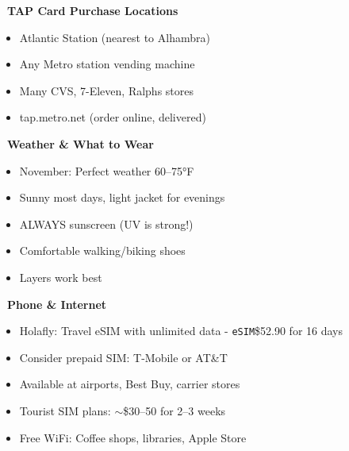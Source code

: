 \documentclass[10pt,letterpaper]{article}
\begin{document}
\begin{infobox}[colback=gray!10,colframe=gray]
\textbf{\faCreditCard\ TAP Card Purchase Locations}
\begin{small}
\begin{itemize}[leftmargin=0.2in,itemsep=0pt]
\item Atlantic Station (nearest to Alhambra)
\item Any Metro station vending machine
\item Many CVS, 7-Eleven, Ralphs stores
\item tap.metro.net (order online, delivered)
\end{itemize}
\end{small}
\end{infobox}

\begin{infobox}[colback=gray!10,colframe=gray]
\textbf{\faSun\ Weather \& What to Wear}
\begin{small}
\begin{itemize}[leftmargin=0.2in,itemsep=0pt]
\item November: Perfect weather 60--75°F
\item Sunny most days, light jacket for evenings
\item ALWAYS sunscreen (UV is strong!)
\item Comfortable walking/biking shoes
\item Layers work best
\end{itemize}
\end{small}
\end{infobox}

\begin{infobox}[colback=gray!10,colframe=gray]
\textbf{\faMobile\ Phone \& Internet}
\begin{small}
\begin{itemize}[leftmargin=0.2in,itemsep=0pt]
\item Holafly: Travel eSIM with unlimited data - \texttt{eSIM}\$52.90 for 16 days
\item Consider prepaid SIM: T-Mobile or AT\&T
\item Available at airports, Best Buy, carrier stores
\item Tourist SIM plans: $\sim$\$30--50 for 2--3 weeks
\item Free WiFi: Coffee shops, libraries, Apple Store
\end{itemize}
\end{small}
\end{infobox}
\end{document}
